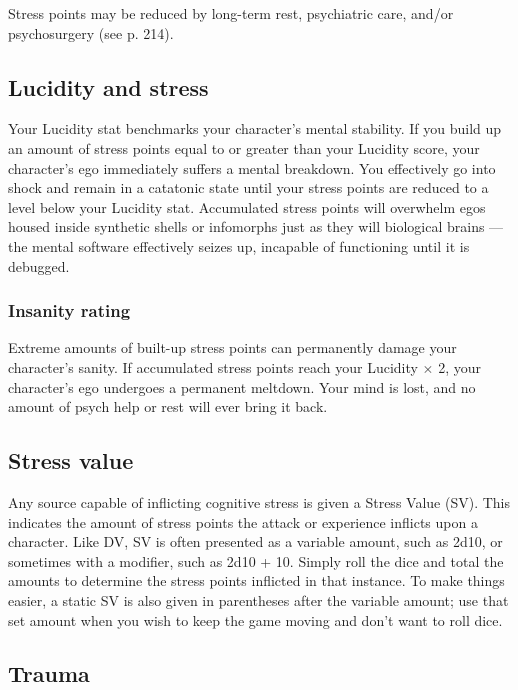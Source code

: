 Stress points may be reduced by long-term rest, psychiatric care, and/or psychosurgery (see p. 214). 



\subsection{Lucidity and stress} \label{sec:lucidity-stress} 

Your Lucidity stat benchmarks your character’s mental stability. If you build up an amount of stress points equal to or greater than your Lucidity score, your character’s ego immediately suffers a mental breakdown. You effectively go into shock and remain in a catatonic state until your stress points are reduced to a level below your Lucidity stat. Accumulated stress points will overwhelm egos housed inside synthetic shells or infomorphs just as they will biological brains --- the mental software effectively seizes up, incapable of functioning until it is debugged. 

\subsubsection{Insanity rating} 

Extreme amounts of built-up stress points can permanently damage your character’s sanity. If accumulated stress points reach your Lucidity $\times$ 2, your character’s ego undergoes a permanent meltdown. Your mind is lost, and no amount of psych help or rest will ever bring it back. 



\subsection{Stress value} \label{sec:stress-value} 

Any source capable of inflicting cognitive stress is given a Stress Value (SV). This indicates the amount of stress points the attack or experience inflicts upon a character. Like DV, SV is often presented as a variable amount, such as 2d10, or sometimes with a modifier, such as 2d10 + 10. Simply roll the dice and total the amounts to determine the stress points inflicted in that instance. To make things easier, a static SV is also given in parentheses after the variable amount; use that set amount when you wish to keep the game moving and don’t want to roll dice. 



\subsection{Trauma} \label{sec:trauma} 

